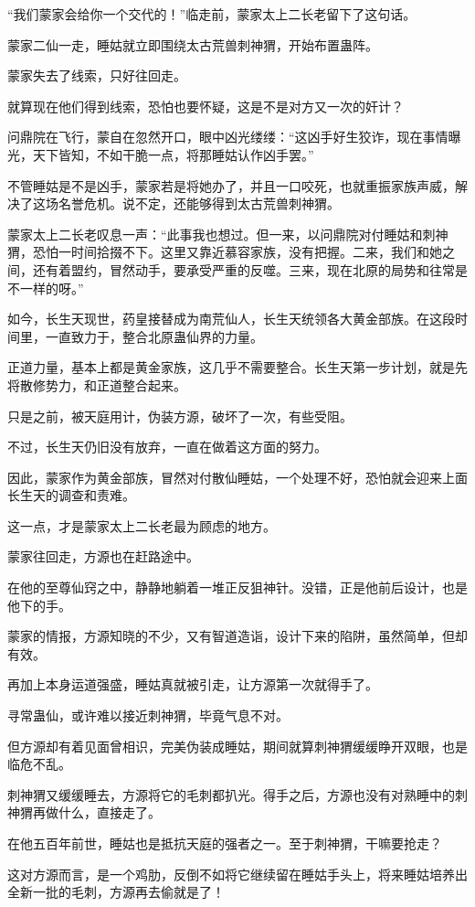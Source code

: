 \begin{this_body}
“我们蒙家会给你一个交代的！”临走前，蒙家太上二长老留下了这句话。

蒙家二仙一走，睡姑就立即围绕太古荒兽刺神猬，开始布置蛊阵。

蒙家失去了线索，只好往回走。

就算现在他们得到线索，恐怕也要怀疑，这是不是对方又一次的奸计？

问鼎院在飞行，蒙自在忽然开口，眼中凶光缕缕：“这凶手好生狡诈，现在事情曝光，天下皆知，不如干脆一点，将那睡姑认作凶手罢。”

不管睡姑是不是凶手，蒙家若是将她办了，并且一口咬死，也就重振家族声威，解决了这场名誉危机。说不定，还能够得到太古荒兽刺神猬。

蒙家太上二长老叹息一声：“此事我也想过。但一来，以问鼎院对付睡姑和刺神猬，恐怕一时间拾掇不下。这里又靠近慕容家族，没有把握。二来，我们和她之间，还有着盟约，冒然动手，要承受严重的反噬。三来，现在北原的局势和往常是不一样的呀。”

如今，长生天现世，药皇接替成为南荒仙人，长生天统领各大黄金部族。在这段时间里，一直致力于，整合北原蛊仙界的力量。

正道力量，基本上都是黄金家族，这几乎不需要整合。长生天第一步计划，就是先将散修势力，和正道整合起来。

只是之前，被天庭用计，伪装方源，破坏了一次，有些受阻。

不过，长生天仍旧没有放弃，一直在做着这方面的努力。

因此，蒙家作为黄金部族，冒然对付散仙睡姑，一个处理不好，恐怕就会迎来上面长生天的调查和责难。

这一点，才是蒙家太上二长老最为顾虑的地方。

蒙家往回走，方源也在赶路途中。

在他的至尊仙窍之中，静静地躺着一堆正反狙神针。没错，正是他前后设计，也是他下的手。

蒙家的情报，方源知晓的不少，又有智道造诣，设计下来的陷阱，虽然简单，但却有效。

再加上本身运道强盛，睡姑真就被引走，让方源第一次就得手了。

寻常蛊仙，或许难以接近刺神猬，毕竟气息不对。

但方源却有着见面曾相识，完美伪装成睡姑，期间就算刺神猬缓缓睁开双眼，也是临危不乱。

刺神猬又缓缓睡去，方源将它的毛刺都扒光。得手之后，方源也没有对熟睡中的刺神猬再做什么，直接走了。

在他五百年前世，睡姑也是抵抗天庭的强者之一。至于刺神猬，干嘛要抢走？

这对方源而言，是一个鸡肋，反倒不如将它继续留在睡姑手头上，将来睡姑培养出全新一批的毛刺，方源再去偷就是了！


\end{this_body}
